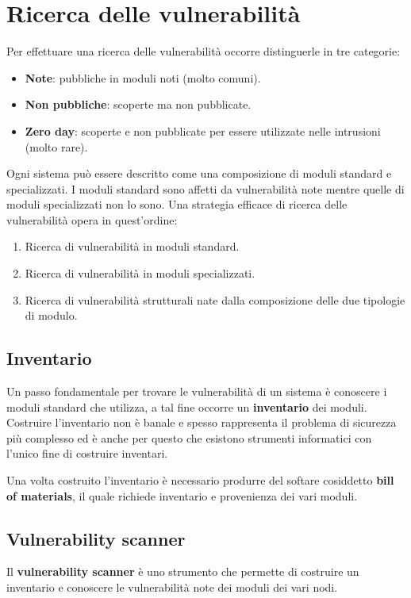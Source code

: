 \section{Ricerca delle vulnerabilità}
Per effettuare una ricerca delle vulnerabilità occorre distinguerle in tre categorie:
\begin{itemize}
	\item \textbf{Note}: pubbliche in moduli noti (molto comuni).
	\item \textbf{Non pubbliche}: scoperte ma non pubblicate.
	\item \textbf{Zero day}: scoperte e non pubblicate per essere utilizzate nelle intrusioni (molto rare).
\end{itemize}

Ogni sistema può essere descritto come una composizione di moduli standard e specializzati. I moduli standard sono
affetti da vulnerabilità note mentre quelle di moduli specializzati non lo sono. Una strategia efficace di ricerca
delle vulnerabilità opera in quest'ordine:
\begin{enumerate}
	\item Ricerca di vulnerabilità in moduli standard.
	\item Ricerca di vulnerabilità in moduli specializzati.
	\item Ricerca di vulnerabilità strutturali nate dalla composizione delle due tipologie di modulo.
\end{enumerate}

\subsection{Inventario}
Un passo fondamentale per trovare le vulnerabilità di un sistema è conoscere i moduli standard che utilizza, a tal
fine occorre un \textbf{inventario} dei moduli. Costruire l'inventario non è banale e spesso rappresenta il problema
di sicurezza più complesso ed è anche per questo che esistono strumenti informatici con l'unico fine di costruire
inventari.

Una volta costruito l'inventario è necessario produrre del softare cosiddetto \textbf{bill of materials}, il quale
richiede inventario e provenienza dei vari moduli.

\subsection{Vulnerability scanner}
Il \textbf{vulnerability scanner} è uno strumento che permette di costruire un inventario e conoscere le vulnerabilità
note dei moduli dei vari nodi.

